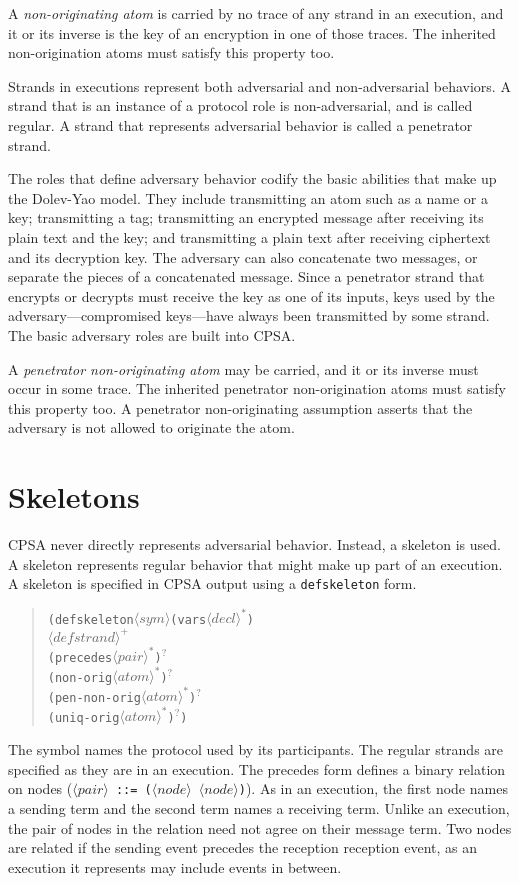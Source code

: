 \documentclass[12pt]{article}
\newcommand{\nterm}[1]{\ensuremath{\langle\mathit{#1}\rangle}}
\newcommand{\nterms}[1]{\ensuremath{\nterm{#1}^\ast}}
\newcommand{\ntermp}[1]{\ensuremath{\nterm{#1}^+}}
\newcommand{\ntermo}[1]{#1$^?$}
\begin{document}
A \emph{non-originating atom} is carried by no trace of any strand in
an execution, and it or its inverse is the key of an encryption in one
of those traces.  The inherited non-origination atoms must satisfy
this property too.

Strands in executions represent both adversarial and non-adversarial
behaviors.  A strand that is an instance of a protocol role is
non-adversarial, and is called regular.  A strand that represents
adversarial behavior is called a penetrator strand.

The roles that define adversary behavior codify the basic abilities
that make up the Dolev-Yao model.  They include transmitting an atom
such as a name or a key; transmitting a tag; transmitting an encrypted
message after receiving its plain text and the key; and transmitting a
plain text after receiving ciphertext and its decryption key.  The
adversary can also concatenate two messages, or separate the pieces of
a concatenated message.  Since a penetrator strand that encrypts or
decrypts must receive the key as one of its inputs, keys used by the
adversary---compromised keys---have always been transmitted by some
strand. The basic adversary roles are built into CPSA.

A \emph{penetrator non-originating atom} may be carried, and it or its
inverse must occur in some trace.  The inherited penetrator
non-origination atoms must satisfy this property too.  A penetrator
non-originating assumption asserts that the adversary is not allowed
to originate the atom.

\section{Skeletons}

CPSA never directly represents adversarial behavior.  Instead, a
skeleton is used.  A skeleton represents regular behavior that might
make up part of an execution. A skeleton is specified in CPSA output using a
\texttt{defskeleton} form.
\begin{quote}
\begin{alltt}
(defskeleton \nterm{sym} (vars \nterms{decl})
\quad \ntermp{defstrand}
\quad \ntermo{(precedes \nterms{pair})}
\quad \ntermo{(non-orig \nterms{atom})}
\quad \ntermo{(pen-non-orig \nterms{atom})}
\quad \ntermo{(uniq-orig \nterms{atom})})
\end{alltt}
\end{quote}
The symbol names the protocol used by its participants.  The regular
strands are specified as they are in an execution.  The precedes form
defines a binary relation on nodes (\texttt{\nterm{pair} ::=
  (\nterm{node} \nterm{node})}).  As in an execution, the first node
names a sending term and the second term names a receiving term.
Unlike an execution, the pair of nodes in the relation need not agree
on their message term.  Two nodes are related if the sending event
precedes the reception reception event, as an execution it represents
may include events in between.
\end{document}
